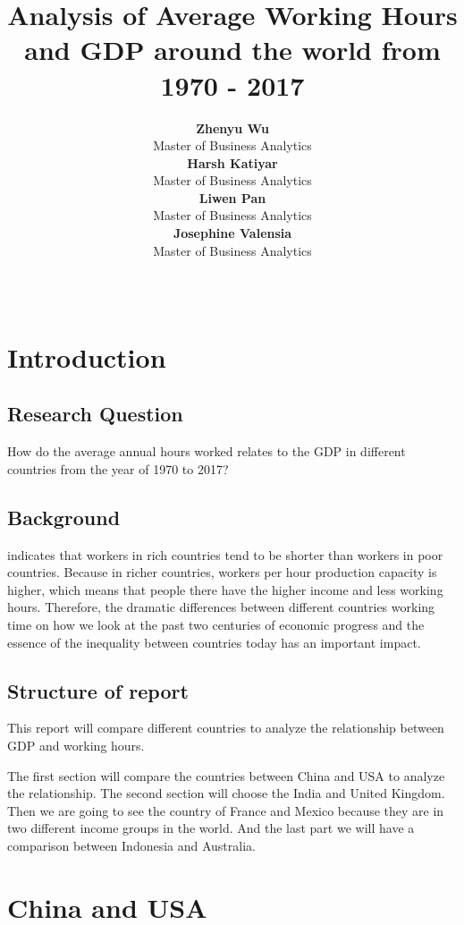 \documentclass[11pt,a4paper,]{article}
\title{Analysis of Average Working Hours and GDP around the world from 1970 - 2017}
\author{\sf\Large\textbf{ Zhenyu Wu}\\ {\sf\large Master of Business Analytics\\[0.5cm]} \sf\Large\textbf{ Harsh Katiyar}\\ {\sf\large Master of Business Analytics\\[0.5cm]} \sf\Large\textbf{ Liwen Pan}\\ {\sf\large Master of Business Analytics\\[0.5cm]} \sf\Large\textbf{ Josephine Valensia}\\ {\sf\large Master of Business Analytics\\[0.5cm]}}
\date{\sf\Date~\Month~\Year}
\makeatletter
\def\titlepage{\front{\expandafter{\@title}}{\@author}{\@organization}}
\makeatother
\begin{document}
\titlepage

\hypertarget{introduction}{%
\section{Introduction}\label{introduction}}

\hypertarget{research-question}{%
\subsection{Research Question}\label{research-question}}

How do the average annual hours worked relates to the GDP in different countries from the year of 1970 to 2017?

\hypertarget{background}{%
\subsection{Background}\label{background}}

\textcite{reference3} indicates that workers in rich countries tend to be shorter than workers in poor countries. Because in richer countries, workers per hour production capacity is higher, which means that people there have the higher income and less working hours. Therefore, the dramatic differences between different countries working time on how we look at the past two centuries of economic progress and the essence of the inequality between countries today has an important impact.

\hypertarget{structure-of-report}{%
\subsection{Structure of report}\label{structure-of-report}}

This report will compare different countries to analyze the relationship between GDP and working hours.

The first section will compare the countries between China and USA to analyze the relationship. The second section will choose the India and United Kingdom. Then we are going to see the country of France and Mexico because they are in two different income groups in the world. And the last part we will have a comparison between Indonesia and Australia.

\hypertarget{china-and-usa}{%
\section{China and USA}\label{china-and-usa}}
\end{document}
